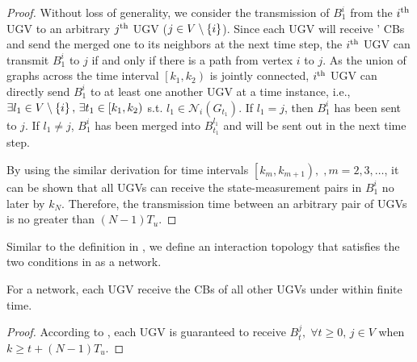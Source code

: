 	\begin{proof}				
		Without loss of generality, we consider the transmission of $B^i_1$ from the $i^\text{th}$ UGV to an arbitrary $j^\text{th}$ UGV ($j\in V\setminus \left\lbrace i\right\rbrace$).
		Since each UGV will receive \dnbhd' CBs and send the merged one to its neighbors at the next time step, the $i^\text{th}$ UGV can transmit $B^i_1$ to $j$ if and only if there is a path from vertex $i$ to $j$.
		As the union of graphs across the time interval $\left[k_1,k_2 \right)$ is jointly connected, $i^\text{th}$ UGV can directly send $B^i_1$ to at least one another UGV at a time instance, i.e., $\exists l_1\in V\setminus \left\lbrace i\right\rbrace,\, \exists t_1\in \left[k_1,k_2 \right)$ s.t. $l_1\in\mathcal{N}_{i}(G_{t_1})$.
		If $l_1=j$, then $B^i_1$ has been sent to $j$.
		If $l_1\neq j$, $B^i_1$ has been merged into $B^{l_1}_{t_1}$ and will be sent out in the next time step. 
		
		By using the similar derivation for time intervals $\left[k_m,k_{m+1} \right),\;,m=2,3,\dots$, it can be shown that all UGVs can receive the state-measurement pairs in $B^i_1$ no later by $k_{N}$.
		Therefore, the transmission time between an arbitrary pair of UGVs is no greater than \small$(N-1)T_u$\normalsize.
	\end{proof}
	
	Similar to the definition in \cite{jadbabaie2003coordination}, we define an interaction topology that satisfies the two conditions in  as a \textit{{\fc}} network.

	\medskip
	\begin{cor}\label{cor1}
		For a {\fc} network, each UGV receive the CBs of all other UGVs under {\proto} within finite time. 
	\end{cor}
	\begin{proof}
		According to ,
		each UGV is guaranteed to receive $B^j_t,\; \forall t\ge 0,\, j\in V$ when \small$k\geq t+(N-1)T_u$\normalsize.
	\end{proof}
	

